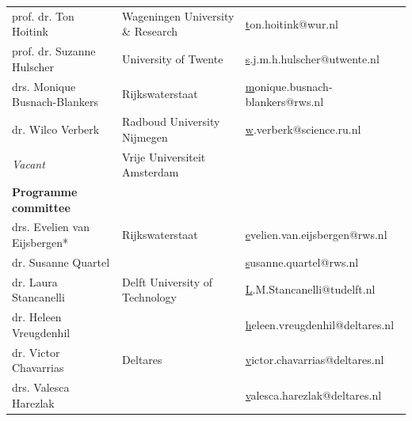 \begin{longtable}{@{}lll@{}}
\rowcolor[HTML]{B9C6D5} 
prof. dr. Ton  Hoitink                 & Wageningen University   \& Research                   & {\color[HTML]{0563C1} {\ul ton.hoitink@wur.nl}}              \\
\rowcolor[HTML]{C9D6D6} 
prof. dr. Suzanne Hulscher             & University of Twente                                  & {\color[HTML]{0563C1} {\ul s.j.m.h.hulscher@utwente.nl}}     \\
\rowcolor[HTML]{B9C6D5} 
drs. Monique Busnach-Blankers          & Rijkswaterstaat                                       & {\color[HTML]{0563C1} {\ul monique.busnach-blankers@rws.nl}} \\
\rowcolor[HTML]{C9D6D6} 
dr. Wilco Verberk                      & Radboud University   Nijmegen                         & {\color[HTML]{0563C1} {\ul w.verberk@science.ru.nl}}         \\
\rowcolor[HTML]{B9C6D5} 
\textit{Vacant}                        & Vrije Universiteit   Amsterdam                        & {\color[HTML]{0563C1} {\ul }}                                \\
\rowcolor[HTML]{C9D6D6} 
\textbf{Programme committee}           &                                                       &                                                              \\
\rowcolor[HTML]{B9C6D5} 
drs. Evelien van Eijsbergen*           & Rijkswaterstaat                                       & {\color[HTML]{0563C1} {\ul evelien.van.eijsbergen@rws.nl}}   \\
\rowcolor[HTML]{C9D6D6} 
dr. Susanne Quartel                   &                                                       & {\color[HTML]{0563C1} {\ul susanne.quartel@rws.nl}}          \\
\rowcolor[HTML]{B9C6D5} 
dr. Laura Stancanelli                  & Delft University of   Technology                      & {\color[HTML]{0563C1} {\ul L.M.Stancanelli@tudelft.nl}}      \\
\rowcolor[HTML]{C9D6D6} 
dr. Heleen Vreugdenhil                 &                                                       & {\color[HTML]{0563C1} {\ul heleen.vreugdenhil@deltares.nl}}  \\
\rowcolor[HTML]{B9C6D5} 
dr. Victor Chavarrias                  & Deltares                                              & {\color[HTML]{0563C1} {\ul victor.chavarrias@deltares.nl}}   \\
\rowcolor[HTML]{C9D6D6} 
drs. Valesca Harezlak                  &                                                       & {\color[HTML]{0563C1} {\ul valesca.harezlak@deltares.nl}}    \\

\end{longtable}
